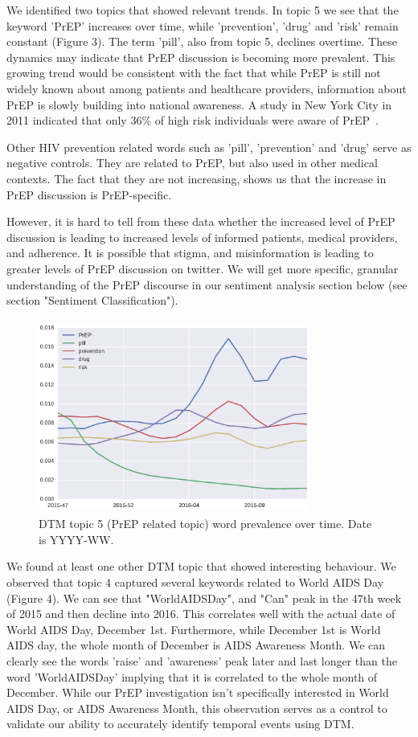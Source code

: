 \documentclass{sig-alternate-05-2015}
\begin{document}
We identified two topics that showed relevant trends. In topic 5 we see that the keyword 'PrEP' increases over time, while 'prevention', 'drug' and 'risk' remain constant (Figure 3). The term 'pill', also from topic 5, declines overtime. These dynamics may indicate that PrEP discussion is becoming more prevalent. This growing trend would be consistent with the fact that while PrEP is still not widely known about among patients and healthcare providers, information about PrEP is slowly building into national awareness. A study in New York City in 2011 indicated that only 36\% of high risk individuals were aware of PrEP~\cite{mehta2011awareness}.

Other HIV prevention related words such as 'pill', 'prevention' and 'drug' serve as negative controls. They are related to PrEP, but also used in other medical contexts. The fact that they are not increasing, shows us that the increase in PrEP discussion is PrEP-specific.

However, it is hard to tell from these data whether the increased level of PrEP discussion is leading to increased levels of informed patients, medical providers, and adherence. It is possible that stigma, and misinformation is leading to greater levels of PrEP discussion on twitter. We will get more specific, granular understanding of the PrEP discourse in our sentiment analysis section below (see section "Sentiment Classification").

\begin{figure}
\centering
\includegraphics[height=2.5in, width=3.5in]{DTMfig1}
\caption{DTM topic 5 (PrEP related topic) word prevalence over time. Date is YYYY-WW.}
\end{figure}

We found at least one other DTM topic that showed interesting behaviour. We observed that topic 4 captured several keywords related to World AIDS Day (Figure 4). We can see that "WorldAIDSDay", and "Can" peak in the 47th week of 2015 and then decline into 2016. This correlates well with the actual date of World AIDS Day, December 1st. Furthermore, while December 1st is World AIDS day, the whole month of December is AIDS Awareness Month. We can clearly see the words 'raise' and 'awareness' peak later and last longer than the word 'WorldAIDSDay' implying that it is correlated to the whole month of December. While our PrEP investigation isn't specifically interested in World AIDS Day, or AIDS Awareness Month, this observation serves as a control to validate our ability to accurately identify temporal events using DTM. 
\end{document}
